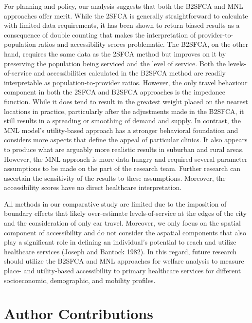 \documentclass{article}
\begin{document}
For planning and policy, our analysis suggests that both the B2SFCA and
MNL approaches offer merit. While the 2SFCA is generally straightforward
to calculate with limited data requirements, it has been shown to return
biased results as a consequence of double counting that makes the
interpretation of provider-to-population ratios and accessibility scores
problematic. The B2SFCA, on the other hand, requires the same data as
the 2SFCA method but improves on it by preserving the population being
serviced and the level of service. Both the levels-of-service and
accessibilities calculated in the B2SFCA method are readily
interpretable as population-to-provider ratios. However, the only travel
behaviour component in both the 2SFCA and B2SFCA approaches is the
impedance function. While it does tend to result in the greatest weight
placed on the nearest locations in practice, particularly after the
adjustments made in the B2SFCA, it still results in a spreading or
smoothing of demand and supply. In contrast, the MNL model's
utility-based approach has a stronger behavioral foundation and
considers more aspects that define the appeal of particular clinics. It
also appears to produce what are arguably more realistic results in
suburban and rural areas. However, the MNL approach is more data-hungry
and required several parameter assumptions to be made on the part of the
research team. Further research can ascertain the sensitivity of the
results to these assumptions. Moreover, the accessibility scores have no
direct healthcare interpretation.

All methods in our comparative study are limited due to the imposition
of boundary effects that likely over-estimate levels-of-service at the
edges of the city and the consideration of only car travel. Moreover, we
only focus on the spatial component of accessibility and do not consider
the aspatial components that also play a significant role in defining an
individual's potential to reach and utilize healthcare services (Joseph
and Bantock 1982). In this regard, future research should utilize the
B2SFCA and MNL approaches for welfare analysis to measure place- and
utility-based accessibility to primary healthcare services for different
socioeconomic, demographic, and mobility profiles.

\hypertarget{author-contributions}{%
\section{Author Contributions}\label{author-contributions}}
\end{document}

